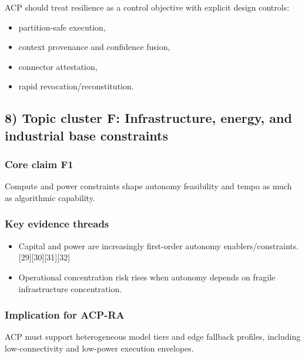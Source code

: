 \documentclass[11pt]{article}
\begin{document}
ACP should treat resilience as a control objective with explicit design
controls:

\begin{itemize}
\tightlist
\item
  partition-safe execution,
\item
  context provenance and confidence fusion,
\item
  connector attestation,
\item
  rapid revocation/reconstitution.
\end{itemize}

\hypertarget{topic-cluster-f-infrastructure-energy-and-industrial-base-constraints}{%
\subsection{8) Topic cluster F: Infrastructure, energy, and industrial
base
constraints}\label{topic-cluster-f-infrastructure-energy-and-industrial-base-constraints}}

\hypertarget{core-claim-f1}{%
\subsubsection{Core claim F1}\label{core-claim-f1}}

Compute and power constraints shape autonomy feasibility and tempo as
much as algorithmic capability.

\hypertarget{key-evidence-threads-5}{%
\subsubsection{Key evidence threads}\label{key-evidence-threads-5}}

\begin{itemize}
\tightlist
\item
  Capital and power are increasingly first-order autonomy
  enablers/constraints. {[}29{]}{[}30{]}{[}31{]}{[}32{]}
\item
  Operational concentration risk rises when autonomy depends on fragile
  infrastructure concentration.
\end{itemize}

\hypertarget{implication-for-acp-ra-5}{%
\subsubsection{Implication for ACP-RA}\label{implication-for-acp-ra-5}}

ACP must support heterogeneous model tiers and edge fallback profiles,
including low-connectivity and low-power execution envelopes.
\end{document}
